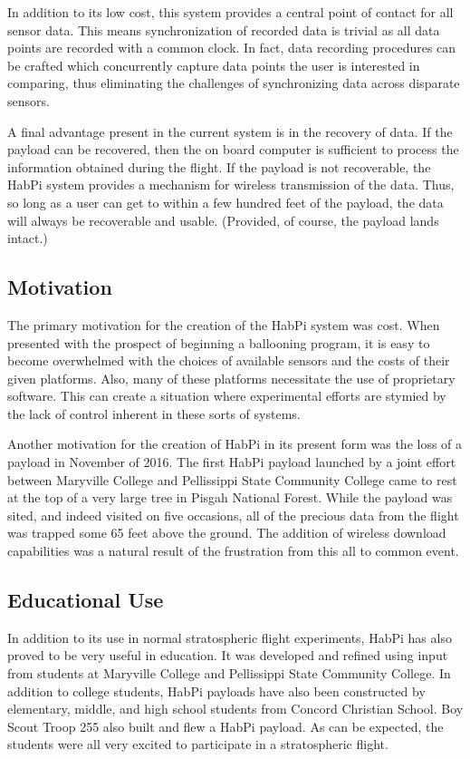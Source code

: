 \documentclass[journal]{new-aiaa}
\begin{document}
In addition to its low cost, this system provides a central point of
contact for all sensor data.  This means synchronization of recorded
data is trivial as all data points are recorded with a common
clock.  In fact, data recording procedures can be crafted which
concurrently capture data points the user is interested in comparing,
thus eliminating the challenges of synchronizing data across disparate
sensors.

A final advantage present in the current system is in the recovery of
data.  If the payload can be recovered, then the on board computer is
sufficient to process the information obtained during the flight.  If
the payload is not recoverable, the HabPi system provides a mechanism
for wireless transmission of the data.  Thus, so long as a user can
get to within a few hundred feet of the payload, the data will always be
recoverable and usable. (Provided, of course, the payload lands
intact.)

\subsection{Motivation}
The primary motivation for the creation of the HabPi system was cost.
When presented with the prospect of beginning a ballooning program, it
is easy to become overwhelmed with the choices of available sensors
and the costs of their given platforms.  Also, many of these platforms
necessitate the use of proprietary software.  This can create
a situation where experimental efforts are stymied by the lack of
control inherent in these sorts of systems.

Another motivation for the creation of HabPi in its present form was
the loss of a payload in November of 2016.  The first HabPi payload launched
by a joint effort between Maryville College and Pellissippi State
Community College came to rest at the top of a very large tree in
Pisgah National Forest.  While the payload was sited, and indeed
visited on five occasions, all of the precious data from the flight
was trapped some 65 feet above the ground.  The addition of wireless
download capabilities was a natural result of the frustration from
this all to common event.

\subsection{Educational Use}
In addition to its use in normal stratospheric flight experiments,
HabPi has also proved to be very useful in education.  It was
developed and refined using input from students at Maryville College
and Pellissippi State Community College.  In addition to college
students, HabPi payloads have also been constructed by elementary,
middle, and high school students from Concord Christian School.  Boy
Scout Troop 255 also built and flew a HabPi payload. As can be
expected, the students were all very excited to participate in
a stratospheric flight.
\end{document}
